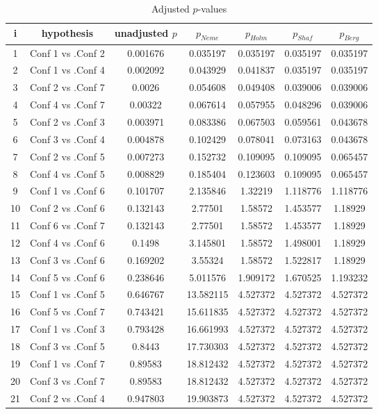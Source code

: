 \documentclass[a4paper,10pt]{article}
\begin{document}
\begin{landscape}
\begin{table}[!htp]
\centering\scriptsize
\begin{tabular}{ccccccc}
i&hypothesis&unadjusted $p$&$p_{Neme}$&$p_{Holm}$&$p_{Shaf}$&$p_{Berg}$\\
\hline1&Conf 1 vs .Conf 2&0.001676&0.035197&0.035197&0.035197&0.035197\\
2&Conf 1 vs .Conf 4&0.002092&0.043929&0.041837&0.035197&0.035197\\
3&Conf 2 vs .Conf 7&0.0026&0.054608&0.049408&0.039006&0.039006\\
4&Conf 4 vs .Conf 7&0.00322&0.067614&0.057955&0.048296&0.039006\\
5&Conf 2 vs .Conf 3&0.003971&0.083386&0.067503&0.059561&0.043678\\
6&Conf 3 vs .Conf 4&0.004878&0.102429&0.078041&0.073163&0.043678\\
7&Conf 2 vs .Conf 5&0.007273&0.152732&0.109095&0.109095&0.065457\\
8&Conf 4 vs .Conf 5&0.008829&0.185404&0.123603&0.109095&0.065457\\
9&Conf 1 vs .Conf 6&0.101707&2.135846&1.32219&1.118776&1.118776\\
10&Conf 2 vs .Conf 6&0.132143&2.77501&1.58572&1.453577&1.18929\\
11&Conf 6 vs .Conf 7&0.132143&2.77501&1.58572&1.453577&1.18929\\
12&Conf 4 vs .Conf 6&0.1498&3.145801&1.58572&1.498001&1.18929\\
13&Conf 3 vs .Conf 6&0.169202&3.55324&1.58572&1.522817&1.18929\\
14&Conf 5 vs .Conf 6&0.238646&5.011576&1.909172&1.670525&1.193232\\
15&Conf 1 vs .Conf 5&0.646767&13.582115&4.527372&4.527372&4.527372\\
16&Conf 5 vs .Conf 7&0.743421&15.611835&4.527372&4.527372&4.527372\\
17&Conf 1 vs .Conf 3&0.793428&16.661993&4.527372&4.527372&4.527372\\
18&Conf 3 vs .Conf 5&0.8443&17.730303&4.527372&4.527372&4.527372\\
19&Conf 1 vs .Conf 7&0.89583&18.812432&4.527372&4.527372&4.527372\\
20&Conf 3 vs .Conf 7&0.89583&18.812432&4.527372&4.527372&4.527372\\
21&Conf 2 vs .Conf 4&0.947803&19.903873&4.527372&4.527372&4.527372\\
\hline
\end{tabular}
\caption{Adjusted $p$-values}
\end{table}

\end{landscape}
\end{document}
